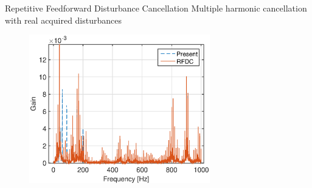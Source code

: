 \documentclass[10pt]{beamer}
\begin{document}
\begin{frame}{Repetitive Feedforward Disturbance Cancellation}
  Multiple harmonic cancellation with real acquired disturbances
  \begin{figure}[h!]
    \centering
    \includegraphics[width=0.7\textwidth]{../fig/matlab/3real_dist_fft.eps}
  \end{figure}
\end{frame}
\end{document}
